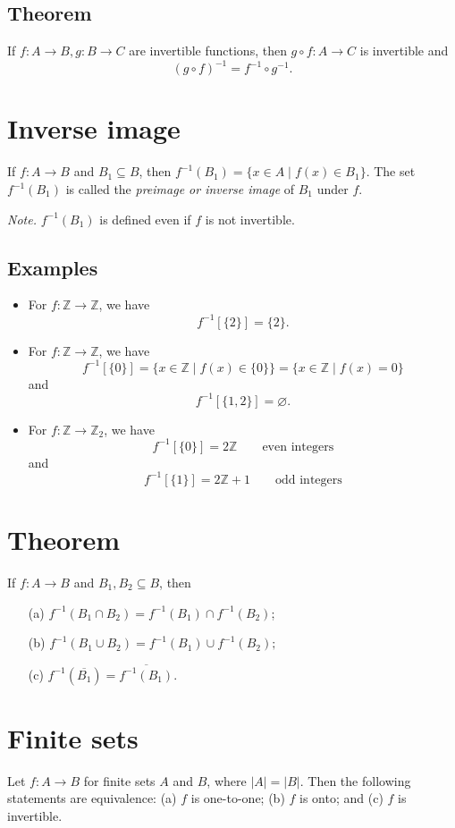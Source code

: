 \documentclass[11pt]{article}
\let\emptyset\varnothing
\begin{document}
    \subsection{Theorem}

    If \(f:A \rightarrow B, g:B \rightarrow C\) are invertible functions, then \(g \circ f: A \rightarrow C\) is invertible and \[(g \circ f)^{-1} = f^{-1} \circ g^{-1}.\]

    \section{Inverse image}

    If \(f: A \rightarrow B\) and \(B_1 \subseteq B\), then \(f^{-1} (B_1) = \{x \in A \mid f(x) \in B_1\}\). The set \(f^{-1}(B_1)\) is called the \emph{preimage or inverse image} of $B_1$ under $f$.

    \vspace{1em}

    \emph{Note.} \(f^{-1}(B_1)\) is defined even if $f$ is not invertible. 

    \subsection{Examples}

    \begin{itemize}
        \item For \(f: \mathbb{Z} \rightarrow \mathbb{Z}\), we have \[f^{-1}[\{2\}] = \{2\}.\]
        \item For \(f: \mathbb{Z} \rightarrow \mathbb{Z}\), we have \[f^{-1}[\{0\}] = \{x \in \mathbb{Z} \mid f(x) \in \{0\}\} = \{x \in \mathbb{Z} \mid f(x) = 0\}\] and \[f^{-1}[\{1,2\}] = \emptyset.\]
        \item For \(f: \mathbb{Z} \rightarrow \mathbb{Z}_2\), we have \[f^{-1}[\{0\}] = 2 \mathbb{Z} \qquad \text{even integers}\] and \[f^{-1}[\{1\}] = 2 \mathbb{Z} + 1 \qquad \text{odd integers}\]
    \end{itemize}

    \section{Theorem}

    If \(f: A \rightarrow B\) and \(B_1, B_2 \subseteq B\), then 
    \begin{enumerate}
        \item[(a)] \(f^{-1}(B_1 \cap B_2) = f^{-1}(B_1) \cap f^{-1}(B_2)\);
        \item[(b)] \(f^{-1}(B_1 \cup B_2) = f^{-1}(B_1) \cup f^{-1}(B_2);\)
        \item[(c)] \(f^{-1}(\overline{B_1}) = \overline{f^{-1}(B_1)}\).   
    \end{enumerate}

    \section{Finite sets}

    Let \(f: A \rightarrow B\) for finite sets $A$ and $B$, where \(|A| = |B|\). Then the following statements are equivalence: (a) $f$ is one-to-one; (b) $f$ is onto; and (c) $f$ is invertible.
\end{document}
